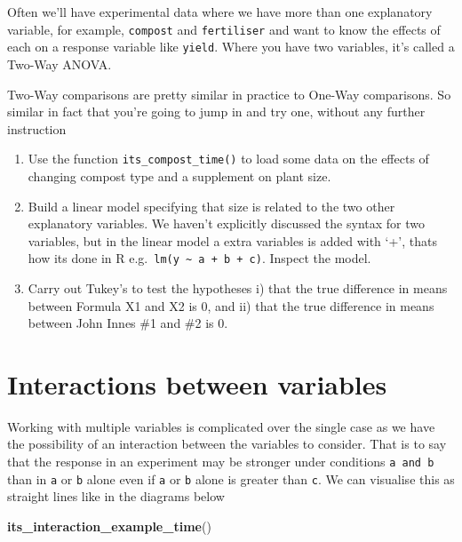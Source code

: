 \documentclass[
]{book}
\newenvironment{Shaded}{\begin{snugshade}}{\end{snugshade}}
\newcommand{\KeywordTok}[1]{\textcolor[rgb]{0.13,0.29,0.53}{\textbf{#1}}}
\newcommand{\NormalTok}[1]{#1}
\providecommand{\tightlist}{%
  \setlength{\itemsep}{0pt}\setlength{\parskip}{0pt}}
\newenvironment{task}
{ \begin{tcolorbox}[title=For you to do,title filled] }
{  \end{tcolorbox} }
\begin{document}
Often we'll have experimental data where we have more than one explanatory variable, for example, \texttt{compost} and \texttt{fertiliser} and want to know the effects of each on a response variable like \texttt{yield}. Where you have two variables, it's called a Two-Way ANOVA.

Two-Way comparisons are pretty similar in practice to One-Way comparisons. So similar in fact that you're going to jump in and try one, without any further instruction

\begin{task}
\begin{enumerate}
\def\labelenumi{\arabic{enumi}.}
\tightlist
\item
  Use the function \texttt{its\_compost\_time()} to load some data on the effects of changing compost type and a supplement on plant size.
\item
  Build a linear model specifying that size is related to the two other explanatory variables. We haven't explicitly discussed the syntax for two variables, but in the linear model a extra variables is added with `+', thats how its done in R e.g.~\texttt{lm(y\ \textasciitilde{}\ a\ +\ b\ +\ c)}. Inspect the model.
\item
  Carry out Tukey's to test the hypotheses i) that the true difference in means between Formula X1 and X2 is 0, and ii) that the true difference in means between John Innes \#1 and \#2 is 0.
\end{enumerate}
\end{task}

\hypertarget{interactions-between-variables}{%
\section{Interactions between variables}\label{interactions-between-variables}}

Working with multiple variables is complicated over the single case as we have the possibility of an interaction between the variables to consider. That is to say that the response in an experiment may be stronger under conditions \texttt{a\ and\ b} than in \texttt{a} or \texttt{b} alone even if \texttt{a} or \texttt{b} alone is greater than \texttt{c}. We can visualise this as straight lines like in the diagrams below

\begin{Shaded}
\begin{Highlighting}[]
\KeywordTok{its_interaction_example_time}\NormalTok{()}
\end{Highlighting}
\end{Shaded}
\end{document}
